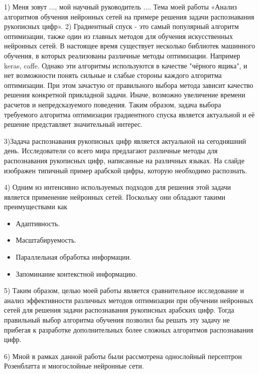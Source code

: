 1) Меня зовут ..., мой научный руководитель .... Тема моей работы «Анализ алгоритмов обучения нейронных сетей на примере решения задачи распознавания рукописных цифр».
2)
Градиентный спуск - это самый популярный алгоритм оптимизации, также один из главных методов для обучения искусственных нейронных сетей. В настоящее время существует несколько библиотек машинного обучения, в которых реализованы различные методы оптимизации. Например keras\cite{bib:keras}, caffe\cite{bib:caffe}. Однако эти алгоритмы используются в качестве "чёрного ящика", и нет возможности понять сильные и слабые стороны каждого алгоритма оптимизации. При этом зачастую от правильного выбора метода зависит качество решения конкретной прикладной задачи. Иначе, возможно увеличение времени расчетов и непредсказуемого поведения. Таким образом, задача выбора требуемого алгоритма оптимизации градиентного спуска является актуальной и её решение представляет значительный интерес.

3)Задача распознавания рукописных цифр является актуальной на сегодняшний день. Исследователи со всего мира предлагают различные методы для распознавания рукописных цифр, написанные на различных языках.  На слайде изображен типичный пример арабской цифры, которую необходимо распознать.

4) Одним из интенсивно используемых подходов для решения этой задачи является применение нейронных сетей. Поскольку они обладают такими преимуществами как
    \begin{itemize}
        \item Адаптивность.
        \item Масштабируемость.
        \item Параллельная обработка информации.
        \item Запоминание контекстной информацию.
    \end{itemize}

5) Таким образом, целью моей работы является сравнительное исследование и анализ эффективности различных методов оптимизации при обучении нейронных сетей для решения задачи распознавания рукописных арабских цифр. Тогда правильный выбор алгоритма обучения позволил бы решать эту задачу не прибегая к разработке дополнительных более сложных алгоритмов распознавания цифр.

6) Мной в рамках данной работы были рассмотрена однослойный персептрон Розенблатта и многослойные нейронные сети.

